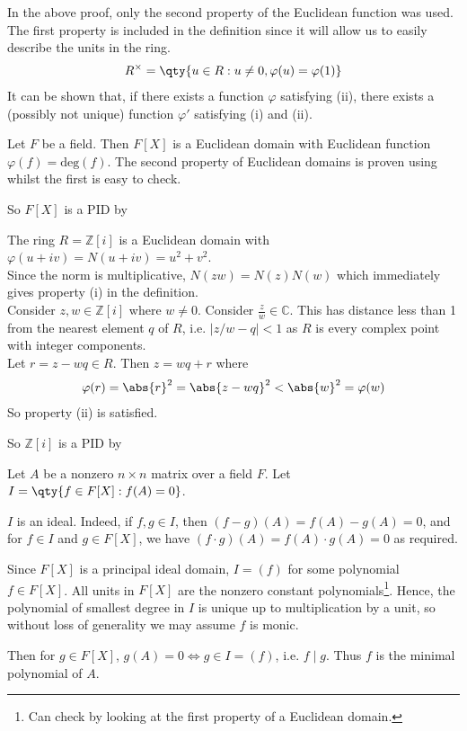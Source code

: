 \begin{remark}
	In the above proof, only the second property of the Euclidean function was used.
	The first property is included in the definition since it will allow us to easily describe the units in the ring.
	\begin{align*}
		R^\times = \qty{u \in R : u \neq 0, \varphi(u) = \varphi(1)}
	\end{align*}
	It can be shown that, if there exists a function $\varphi$ satisfying (ii), there exists a (possibly not unique) function $\varphi'$ satisfying (i) and (ii).
\end{remark}

\begin{example}
	Let $F$ be a field.
	Then $F[X]$ is a Euclidean domain with Euclidean function $\varphi(f) = \mathrm{deg}(f)$.
	The second property of Euclidean domains is proven using  whilst the first is easy to check.

	So $F[X]$ is a PID by 
\end{example}

\begin{example}
	The ring $R = \mathbb Z[i]$ is a Euclidean domain with $\varphi(u+iv) = N(u+iv) = u^2+v^2$. \\
	Since the norm is multiplicative, $N(zw) = N(z)N(w)$ which immediately gives property (i) in the definition. \\
	Consider $z, w \in \mathbb Z[i]$ where $w \neq 0$.
	Consider $\frac{z}{w} \in \mathbb C$.
	This has distance less than 1 from the nearest element $q$ of $R$, i.e. $|z / w - q| < 1$ as $R$ is every complex point with integer components. \\
	Let $r = z - w q \in R$.
	Then $z = w q + r$ where
	\begin{align*}
		\varphi(r) = \abs{r}^2 = \abs{z - w q}^2 < \abs{w}^2 = \varphi(w)
	\end{align*}
	So property (ii) is satisfied.

	So $\mathbb Z[i]$ is a PID by 
\end{example} 

\begin{example}
	Let $A$ be a nonzero $n \times n$ matrix over a field $F$.
	Let $I = \qty{f \in F[X] : f(A) = 0}$.

	$I$ is an ideal.
	Indeed, if $f, g \in I$, then $(f-g)(A) = f(A) - g(A) = 0$, and for $f \in I$ and $g \in F[X]$, we have $(f \cdot g)(A) = f(A) \cdot g(A) = 0$ as required.

	Since $F[X]$ is a principal ideal domain, $I = (f)$ for some polynomial $f \in F[X]$.
	All units in $F[X]$ are the nonzero constant polynomials\footnote{Can check by looking at the first property of a Euclidean domain.}.
	Hence, the polynomial of smallest degree in $I$ is unique up to multiplication by a unit, so without loss of generality we may assume $f$ is monic.

	Then for $g \in F[X]$, $g(A) = 0 \iff g \in I = (f)$, i.e. $f \mid g$.
	Thus $f$ is the minimal polynomial of $A$.
\end{example}

